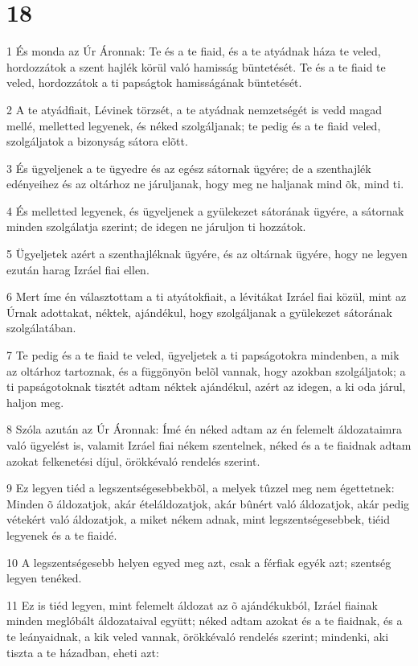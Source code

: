 \chapter{18}

\par 1 És monda az Úr Áronnak: Te és a te fiaid, és a te atyádnak háza te veled, hordozzátok a szent hajlék körül való hamisság büntetését. Te és a te fiaid te veled, hordozzátok a ti papságtok hamisságának büntetését.
\par 2 A te atyádfiait, Lévinek törzsét, a te atyádnak nemzetségét is vedd magad mellé, melletted legyenek, és néked szolgáljanak; te pedig és a te fiaid veled, szolgáljatok a bizonyság sátora elõtt.
\par 3 És ügyeljenek a te ügyedre és az egész sátornak ügyére; de a szenthajlék edényeihez és az oltárhoz ne járuljanak, hogy meg ne haljanak mind õk, mind ti.
\par 4 És melletted legyenek, és ügyeljenek a gyülekezet sátorának ügyére, a sátornak minden szolgálatja szerint; de idegen ne járuljon ti hozzátok.
\par 5 Ügyeljetek azért a szenthajléknak ügyére, és az oltárnak ügyére, hogy ne legyen ezután harag Izráel fiai ellen.
\par 6 Mert íme én választottam a ti atyátokfiait, a lévitákat Izráel fiai közül, mint az Úrnak adottakat, néktek, ajándékul, hogy szolgáljanak a gyülekezet sátorának szolgálatában.
\par 7 Te pedig és a te fiaid te veled, ügyeljetek a ti papságotokra mindenben, a mik az oltárhoz tartoznak, és a függönyön belõl vannak, hogy azokban szolgáljatok; a ti papságotoknak tisztét adtam néktek ajándékul, azért az idegen, a ki oda járul, haljon meg.
\par 8 Szóla azután az Úr Áronnak: Ímé én néked adtam az én felemelt áldozataimra való ügyelést is, valamit Izráel fiai nékem szentelnek, néked és a te fiaidnak adtam azokat felkenetési díjul, örökkévaló rendelés szerint.
\par 9 Ez legyen tiéd a legszentségesebbekbõl, a melyek tûzzel meg nem égettetnek: Minden õ áldozatjok, akár ételáldozatjok, akár bûnért való áldozatjok, akár pedig vétekért való áldozatjok, a miket nékem adnak, mint legszentségesebbek, tiéid legyenek és a te fiaidé.
\par 10 A legszentségesebb helyen egyed meg azt, csak a férfiak egyék azt; szentség legyen tenéked.
\par 11 Ez is tiéd legyen, mint felemelt áldozat az õ ajándékukból, Izráel fiainak minden meglóbált áldozataival együtt; néked adtam azokat és a te fiaidnak, és a te leányaidnak, a kik veled vannak, örökkévaló rendelés szerint; mindenki, aki tiszta a te házadban, eheti azt:
